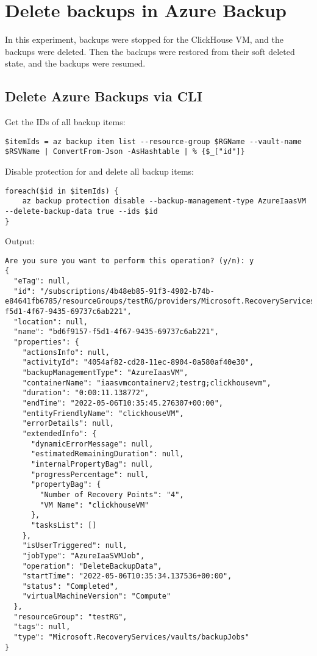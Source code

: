 \section{Delete backups in Azure Backup}
\label{app:chs2e4}
In this experiment,
backups were stopped for the ClickHouse VM,
and the backups were deleted.
Then the backups were restored from their soft deleted state,
and the backups were resumed.

\subsection{Delete Azure Backups via CLI}
\label{sec:org19b15b2}
Get the IDs of all backup items:
\begin{verbatim}
$itemIds = az backup item list --resource-group $RGName --vault-name $RSVName | ConvertFrom-Json -AsHashtable | % {$_["id"]}
\end{verbatim}

Disable protection for and delete all backup items:
\begin{verbatim}
foreach($id in $itemIds) {
    az backup protection disable --backup-management-type AzureIaasVM --delete-backup-data true --ids $id
}
\end{verbatim}

Output:
\begin{verbatim}
Are you sure you want to perform this operation? (y/n): y
{
  "eTag": null,
  "id": "/subscriptions/4b48eb85-91f3-4902-b74b-e84641fb6785/resourceGroups/testRG/providers/Microsoft.RecoveryServices/vaults/myRSV/backupJobs/bd6f9157-f5d1-4f67-9435-69737c6ab221",
  "location": null,
  "name": "bd6f9157-f5d1-4f67-9435-69737c6ab221",
  "properties": {
    "actionsInfo": null,
    "activityId": "4054af82-cd28-11ec-8904-0a580af40e30",
    "backupManagementType": "AzureIaasVM",
    "containerName": "iaasvmcontainerv2;testrg;clickhousevm",
    "duration": "0:00:11.138772",
    "endTime": "2022-05-06T10:35:45.276307+00:00",
    "entityFriendlyName": "clickhouseVM",
    "errorDetails": null,
    "extendedInfo": {
      "dynamicErrorMessage": null,
      "estimatedRemainingDuration": null,
      "internalPropertyBag": null,
      "progressPercentage": null,
      "propertyBag": {
        "Number of Recovery Points": "4",
        "VM Name": "clickhouseVM"
      },
      "tasksList": []
    },
    "isUserTriggered": null,
    "jobType": "AzureIaaSVMJob",
    "operation": "DeleteBackupData",
    "startTime": "2022-05-06T10:35:34.137536+00:00",
    "status": "Completed",
    "virtualMachineVersion": "Compute"
  },
  "resourceGroup": "testRG",
  "tags": null,
  "type": "Microsoft.RecoveryServices/vaults/backupJobs"
}
\end{verbatim}

